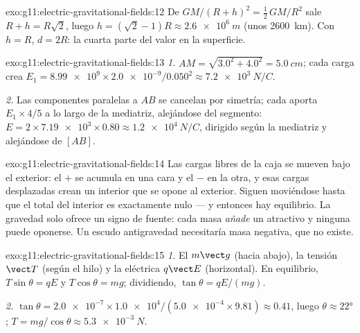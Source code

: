 \begin{solution}{exo:g11:electric-gravitational-fields:12}
De $GM/(R+h)^2 = \tfrac12\,GM/R^2$ sale $R + h = R\sqrt{2}$, luego
$h = (\sqrt{2} - 1)R \approx \qty{2.6e6}{m}$ (unos \qty{2600}{km}). Con
$h = R$, $d = 2R$: la cuarta parte del valor en la superficie.
\end{solution}

\begin{solution}{exo:g11:electric-gravitational-fields:13}
\emph{1.} $AM = \sqrt{3.0^2 + 4.0^2} = \qty{5.0}{cm}$; cada carga crea
$E_1 = \num{8.99e9} \times \num{2.0e-9} / 0.050^2
\approx \qty{7.2e3}{N/C}$.

\emph{2.} Las componentes paralelas a $AB$ se cancelan por simetría;
cada  aporta $E_1 \times 4/5$ a lo largo de la mediatriz,
alejándose del segmento:
$E = 2 \times \num{7.19e3} \times 0.80 \approx \qty{1.2e4}{N/C}$,
dirigido según la mediatriz y alejándose de $[AB]$.
\end{solution}

\begin{solution}{exo:g11:electric-gravitational-fields:14}
Las cargas libres de la caja se mueven bajo el  exterior: el $+$ se
acumula en una cara y el $-$ en la otra, y esas cargas desplazadas crean
un  interior que se opone al exterior. Siguen moviéndose hasta que
el  total del interior es exactamente nulo --- y entonces hay
equilibrio. La gravedad solo ofrece un signo de fuente: cada masa
\emph{añade} un  atractivo y ninguna puede oponerse. Un escudo
antigravedad necesitaría masa negativa, que no existe.
\end{solution}

\begin{solution}{exo:g11:electric-gravitational-fields:15}
\emph{1.} El  $m\vect g$ (hacia abajo), la tensión $\vect T$ (según
el hilo) y la  eléctrica $q\vect E$ (horizontal). En equilibrio,
$T\sin\theta = qE$ y $T\cos\theta = mg$; dividiendo,
$\tan\theta = qE/(mg)$.

\emph{2.} $\tan\theta = \num{2.0e-7} \times \num{1.0e4} /
(\num{5.0e-4} \times 9.81) \approx 0.41$, luego
$\theta \approx \ang{22}$; $T = mg/\cos\theta \approx \qty{5.3e-3}{N}$.
\end{solution}


